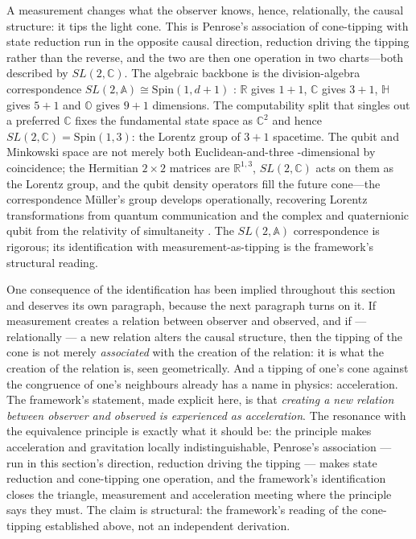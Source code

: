 A measurement changes what the observer knows, hence, relationally, the causal
structure: it tips the light cone. This is Penrose's association of cone-tipping
with state reduction \autocite{Penrose1996} run in the opposite causal direction,
reduction driving the tipping rather than the reverse, and the two are then one
operation in two charts---both described by $SL(2,\mathbb{C})$. The algebraic
backbone is the division-algebra correspondence
$SL(2,\mathbb{A})\cong\mathrm{Spin}(1,d{+}1)$ \autocite{baez2002octonions}: $\mathbb{R}$
gives $1{+}1$, $\mathbb{C}$ gives $3{+}1$, $\mathbb{H}$ gives $5{+}1$ and
$\mathbb{O}$ gives $9{+}1$ dimensions. The computability split that singles out a
preferred $\mathbb{C}$ fixes the fundamental state space as $\mathbb{C}^{2}$ and
hence $SL(2,\mathbb{C})=\mathrm{Spin}(1,3)$: the Lorentz group of $3{+}1$
spacetime. The qubit and Minkowski space are not merely both Euclidean-and-three%
-dimensional by coincidence; the Hermitian $2\times2$ matrices are
$\mathbb{R}^{1,3}$, $SL(2,\mathbb{C})$ acts on them as the Lorentz group, and the
qubit density operators fill the future cone---the correspondence M\"uller's group
develops operationally, recovering Lorentz transformations from quantum
communication \autocite{HohnMueller2016} and the complex and quaternionic qubit
from the relativity of simultaneity \autocite{GarnerMuellerDahlsten2017}. The
$SL(2,\mathbb{A})$ correspondence is rigorous; its identification with
measurement-as-tipping is the framework's structural reading.

One consequence of the identification has been implied throughout this section and deserves its own
paragraph, because the next paragraph turns on it. If measurement creates a relation between
observer and observed, and if --- relationally --- a new relation alters the causal structure, then
the tipping of the cone is not merely \emph{associated} with the creation of the relation: it is
what the creation of the relation is, seen geometrically. And a tipping of one's cone against the
congruence of one's neighbours already has a name in physics: acceleration. The framework's
statement, made explicit here, is that \emph{creating a new relation between observer and observed
is experienced as acceleration}. The resonance with the equivalence principle is exactly what it
should be: the principle makes acceleration and gravitation locally indistinguishable, Penrose's
association --- run in this section's direction, reduction driving the tipping --- makes state
reduction and cone-tipping one operation, and the framework's identification closes the triangle,
measurement and acceleration meeting where the principle says they must. The claim is structural:
the framework's reading of the cone-tipping established above, not an independent derivation.

